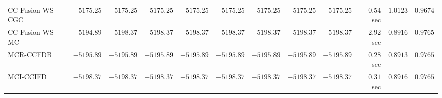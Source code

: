 \begin{table}[H]
\begin{tabular}{lrrrrrrrrrrr}
    CC-Fusion-WS-CGC & $     -5175.25$ & $     -5175.25$ & $     -5175.25$ & $     -5175.25$ & $     -5175.25$ & $     -5175.25$ & $     -5175.25$ & $     -5175.25$ & $         0.54$ sec    & $       1.0123$  & $       0.9674$ \\ 
     CC-Fusion-WS-MC & $     -5194.89$ & $     -5198.37$ & $     -5198.37$ & $     -5198.37$ & $     -5198.37$ & $     -5198.37$ & $     -5198.37$ & $     -5198.37$ & $         2.92$ sec    & $       0.8916$  & $       0.9765$ \\ 
\cmidrule{1-1} 
           MCR-CCFDB & $     -5195.89$ & $     -5195.89$ & $     -5195.89$ & $     -5195.89$ & $     -5195.89$ & $     -5195.89$ & $     -5195.89$ & $     -5195.89$ & $         0.28$ sec    & $       0.8913$  & $       0.9765$ \\ 
\cmidrule{1-1} 
           MCI-CCIFD & $     -5198.37$ & $     -5198.37$ & $     -5198.37$ & $     -5198.37$ & $     -5198.37$ & $     -5198.37$ & $     -5198.37$ & $     -5198.37$ & $         0.31$ sec    & $       0.8916$  & $       0.9765$ \\ 
\bottomrule
\end{tabular}
\end{table}

